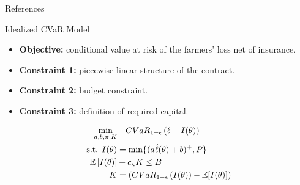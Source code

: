 \documentclass{beamer}
\begin{document}


\begin{frame}{References}
\printbibliography
\end{frame}

\begin{frame}{Idealized CVaR Model}
\begin{itemize}
    \item \textbf{Objective:} conditional value at risk of the farmers' loss net of insurance.
    \item  \textbf{Constraint 1:} piecewise linear structure of the contract. 
    \item \textbf{Constraint 2:} budget constraint.
    \item \textbf{Constraint 3:} definition of required capital.
\end{itemize}
 
\begin{align}
        \min_{a,b,\pi, K}  & \quad CVaR_{1-\epsilon}\left ( \ell - I(\theta) \right ) \notag\\
        \text{s.t.   }I(\theta) &= \min \{ (a\hat{\ell}(\theta) + b)^+,P \} \\
        \mathbb{E}\left [ I(\theta) \right ] &+ c_{\kappa} K \leq B \\
        K &= \left( CVaR_{1-\epsilon}\left ( I(\theta) \right ) - \mathbb{E}[I(\theta)] \right) \label{cons-budget}
    \end{align}
\end{frame}
\end{document}
